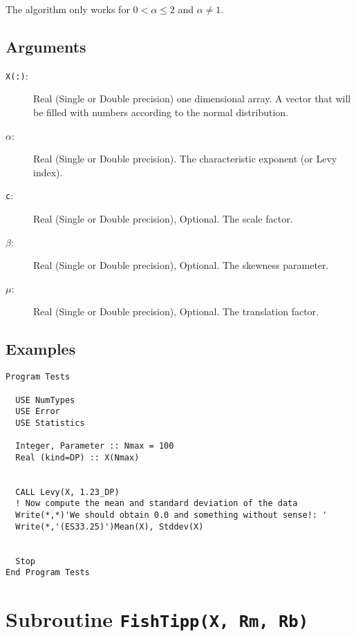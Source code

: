 The algorithm only works for $0 < \alpha \le 2$ and $\alpha \neq 1$. 

\subsection{Arguments}

\begin{description}
\item[\texttt{X(:)}:] Real (Single or Double precision) one
  dimensional array. A vector that will be filled with numbers
  according to the normal distribution.
\item[$\alpha$:] Real (Single or Double precision). The
  characteristic exponent (or Levy index).
\item[\texttt{c}:] Real (Single or Double precision), Optional. The
  scale factor.
\item[$\beta$:] Real (Single or Double precision), Optional. The 
  skewness parameter.
\item[$\mu$:] Real (Single or Double precision), Optional. The 
  translation factor.
\end{description}

\subsection{Examples}

\begin{lstlisting}[emph=Levy,
                   emphstyle=\color{blue},
                   frame=trBL,
                   caption=Obtaining numbers with a Levy skew stable distribution.,
                   label=normal]
Program Tests

  USE NumTypes
  USE Error
  USE Statistics

  Integer, Parameter :: Nmax = 100
  Real (kind=DP) :: X(Nmax)


  CALL Levy(X, 1.23_DP)
  ! Now compute the mean and standard deviation of the data
  Write(*,*)'We should obtain 0.0 and something without sense!: '
  Write(*,'(ES33.25)')Mean(X), Stddev(X)


  Stop
End Program Tests
\end{lstlisting}


\section{Subroutine \texttt{FishTipp(X, Rm, Rb)}}

